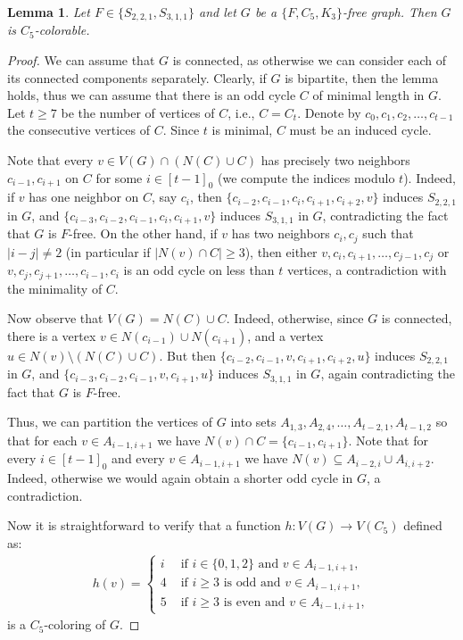 \documentclass[11pt,a4paper]{article}
\theoremstyle{mystyle}
\newtheorem{lemma}[theorem]{Lemma}
\begin{document}
\begin{lemma}\label{lem:sttt-finite}
Let $F \in \{S_{2,2,1},S_{3,1,1}\}$ and let $G$ be a $\{F,C_5,K_3\}$-free graph. Then $G$ is $C_5$-colorable.
\end{lemma}
\begin{proof}
We can assume that $G$ is connected, as otherwise we can consider each of its connected components separately.
Clearly, if $G$ is bipartite, then the lemma holds, thus we can assume that there is an odd cycle $C$ of minimal length in $G$. Let $t \geq 7$ be the number of vertices of $C$, i.e., $C=C_t$. Denote by $c_0,c_1,c_2,\ldots,c_{t-1}$ the consecutive vertices of $C$. Since $t$ is minimal, $C$ must be an induced cycle.

Note that every $v \in V(G) \cap (N(C) \cup C)$ has precisely two neighbors $c_{i-1},c_{i+1}$ on $C$ for some $i \in [t-1]_0$ (we compute the indices modulo $t$). Indeed, if $v$ has one neighbor on $C$, say $c_i$, then $\{c_{i-2},c_{i-1},c_i,c_{i+1},c_{i+2},v\}$ induces $S_{2,2,1}$ in $G$, and $\{c_{i-3},c_{i-2},c_{i-1},c_i,c_{i+1},v\}$ induces $S_{3,1,1}$ in $G$, contradicting the fact that $G$ is $F$-free.
On the other hand, if $v$ has two neighbors $c_i,c_j$ such that $|i-j|\neq 2$ (in particular if $|N(v) \cap C| \geq 3$), then either $v,c_i,c_{i+1},\ldots,c_{j-1},c_j$ or $v,c_j,c_{j+1},\ldots,c_{i-1},c_i$ is an odd cycle on less than $t$ vertices, a contradiction with the minimality of $C$.

Now observe that $V(G)=N(C) \cup C$. Indeed, otherwise, since $G$ is connected, there is a vertex $v \in N(c_{i-1})\cup N(c_{i+1})$, and a vertex $u \in N(v) \setminus (N(C)\cup C)$. But then $\{c_{i-2},c_{i-1},v,c_{i+1},c_{i+2},u\}$ induces $S_{2,2,1}$ in $G$, and $\{c_{i-3},c_{i-2},c_{i-1},v,c_{i+1},u\}$ induces $S_{3,1,1}$ in $G$, again contradicting the fact that $G$ is $F$-free.

Thus, we can partition the vertices of $G$ into sets $A_{1,3},A_{2,4},\ldots,A_{t-2,1},A_{t-1,2}$ so that for each $v \in A_{i-1,i+1}$ we have $N(v) \cap C=\{c_{i-1},c_{i+1}\}$. Note that for every $i \in [t-1]_0$ and every $v \in A_{i-1,i+1}$ we have $N(v) \subseteq A_{i-2,i} \cup A_{i,i+2}$. Indeed, otherwise we would again obtain a shorter odd cycle in $G$, a contradiction.

Now it is straightforward to verify that a function $h:V(G) \to V(C_5)$ defined as:
\begin{align*}
h(v)=\begin{cases}
i & \textrm{ if }i \in \{0,1,2\} \textrm{ and } v \in A_{i-1,i+1}, \\
4  & \textrm{ if }i \geq 3 \textrm{ is odd and } v \in A_{i-1,i+1}, \\
5  & \textrm{ if }i \geq 3 \textrm{ is even and } v \in A_{i-1,i+1},
\end{cases}
\end{align*}
is a $C_5$-coloring of $G$.
\end{proof}
\end{document}
